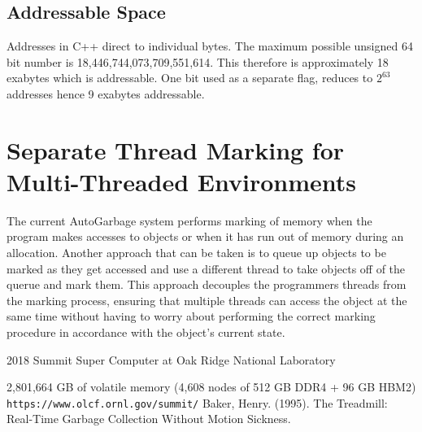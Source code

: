 \documentclass[11pt]{article}
\begin{document}
\subsection{Addressable Space}
\label{app:addessablespace}
Addresses in C++ direct to individual bytes. The maximum possible unsigned 64 bit number is
18,446,744,073,709,551,614. This therefore is approximately 18 exabytes which is addressable. One bit
used as a separate flag, reduces to $2^{63}$ addresses hence 9 exabytes addressable.

\section{Separate Thread Marking for Multi-Threaded Environments}
\label{app:multithreadedmarking}
The current AutoGarbage system performs marking of memory when the program makes accesses to objects
or when it has run out of memory during an allocation. Another approach that can be taken is to 
queue up objects to be marked as they get accessed and use a different thread to take objects off of the querue
and mark them. This approach decouples the programmers threads from the marking process, ensuring that multiple threads
can access the object at the same time without having to worry about performing the correct marking
procedure in accordance with the object's current state.

\newpage
\begin{thebibliography}{9}
2018 Summit Super Computer at Oak Ridge National Laboratory

2,801,664 GB of volatile memory (4,608 nodes of 512 GB DDR4 + 96 GB HBM2)
\texttt{https://www.olcf.ornl.gov/summit/}
Baker, Henry. (1995). The Treadmill: Real-Time Garbage Collection Without Motion Sickness. 
\end{thebibliography}
\end{document}

